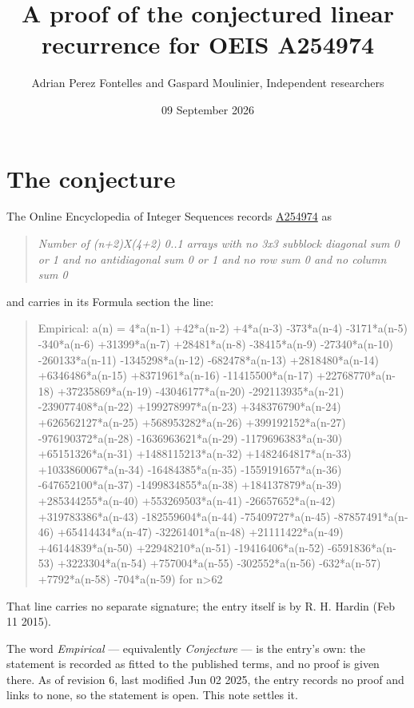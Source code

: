 \documentclass[11pt]{article}
\title{A proof of the conjectured linear recurrence for OEIS A254974}
\author{Adrian Perez Fontelles and Gaspard Moulinier, Independent researchers}
\date{09 September 2026}
\theoremstyle{definition}
\begin{document}
\maketitle
\section{The conjecture}

The Online Encyclopedia of Integer Sequences records \href{https://oeis.org/A254974}{A254974} as

\begin{quote}\itshape Number of (n+2)X(4+2) 0..1 arrays with no 3x3 subblock diagonal sum 0 or 1 and no antidiagonal sum 0 or 1 and no row sum 0 and no column sum 0\end{quote}

and carries in its Formula section the line:

\begin{quote}\ttfamily Empirical: a(n) = 4*a(n-1) +42*a(n-2) +4*a(n-3) -373*a(n-4) -3171*a(n-5) -340*a(n-6) +31399*a(n-7) +28481*a(n-8) -38415*a(n-9) -27340*a(n-10) -260133*a(n-11) -1345298*a(n-12) -682478*a(n-13) +2818480*a(n-14) +6346486*a(n-15) +8371961*a(n-16) -11415500*a(n-17) +22768770*a(n-18) +37235869*a(n-19) -43046177*a(n-20) -292113935*a(n-21) -239077408*a(n-22) +199278997*a(n-23) +348376790*a(n-24) +626562127*a(n-25) +568953282*a(n-26) +399192152*a(n-27) -976190372*a(n-28) -1636963621*a(n-29) -1179696383*a(n-30) +65151326*a(n-31) +1488115213*a(n-32) +1482464817*a(n-33) +1033860067*a(n-34) -16484385*a(n-35) -1559191657*a(n-36) -647652100*a(n-37) -1499834855*a(n-38) +184137879*a(n-39) +285344255*a(n-40) +553269503*a(n-41) -26657652*a(n-42) +319783386*a(n-43) -182559604*a(n-44) -75409727*a(n-45) -87857491*a(n-46) +65414434*a(n-47) -32261401*a(n-48) +21111422*a(n-49) +46144839*a(n-50) +22948210*a(n-51) -19416406*a(n-52) -6591836*a(n-53) +3223304*a(n-54) +757004*a(n-55) -302552*a(n-56) -632*a(n-57) +7792*a(n-58) -704*a(n-59) for n>62\end{quote}

That line carries no separate signature; the entry itself is by R. H. Hardin (Feb 11 2015).

The word {\itshape Empirical} --- equivalently {\itshape Conjecture} --- is the entry's own: the statement is recorded as fitted to the published terms, and no proof is given there. As of revision 6, last modified Jun 02 2025, the entry records no proof and links to none, so the statement is open. This note settles it.
\end{document}
